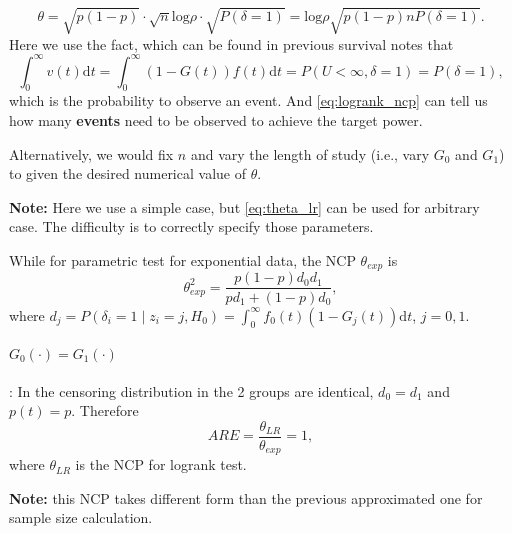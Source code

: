 \documentclass[a4paper,12pt]{article}
\begin{document}
\begin{equation}
  \label{eq:logrank_ncp}
  \theta =
  \sqrt{p\left(1 - p\right)}
  \cdot
  \sqrt{n}\mathrm{log}\rho
  \cdot
  \sqrt{P\left(\delta = 1\right)}
  =
  \mathrm{log}\rho
  \sqrt{
    p\left(1 - p\right)
    n
    P\left(\delta = 1\right)
  }
  .  
\end{equation}
Here we use the fact, which can be found in {\color{red} previous survival notes} that
\[
  \int_0^\infty v\left(t\right)\mathrm{d}t =
  \int_0^\infty \left(1 - G\left(t\right)\right)f\left(t\right)
  \mathrm{d}t
  = P\left(U < \infty, \delta = 1\right)
  = P\left(\delta = 1\right)
  ,
\]
which is the probability to observe an event. And \eqref{eq:logrank_ncp} can tell us how many \textbf{events} need to be observed to achieve the target power.
\par
Alternatively, we would fix $n$ and vary the length of study (i.e., vary $G_0$ and $G_1$) to given the desired numerical value of $\theta$.
\par
\textbf{Note:} Here we use a simple case, but \eqref{eq:theta_lr} can be used for arbitrary case. The difficulty is to correctly specify those parameters.
\par
While for parametric test for exponential data, the NCP $\theta_{exp}$ is
\[
  \theta^2_{exp}
  = \frac{
    p\left(1 - p\right)d_0d_1
  }{
    pd_1 + \left(1 - p\right)d_0
  }
  ,
\]
where $d_j = P\left(\delta_i = 1\middle|z_i = j, H_0\right) = \int_0^{\infty}f_0\left(t\right)\left(1 - G_j\left(t\right)\right)\mathrm{d}t$, $j = 0, 1$. 
\par

\paragraph{$G_0\left(\cdot\right) = G_1\left(\cdot\right)$}: In the censoring distribution in the 2 groups are identical, $d_0 = d_1$ and $p\left(t\right) = p$. Therefore
\[
  ARE = \frac{\theta_{LR}}{\theta_{exp}} = 1
  ,
\]
where $\theta_{LR}$ is the NCP for logrank test.
\par
\textbf{Note:} this NCP takes different form than the previous approximated one for sample size calculation.






\end{document}
